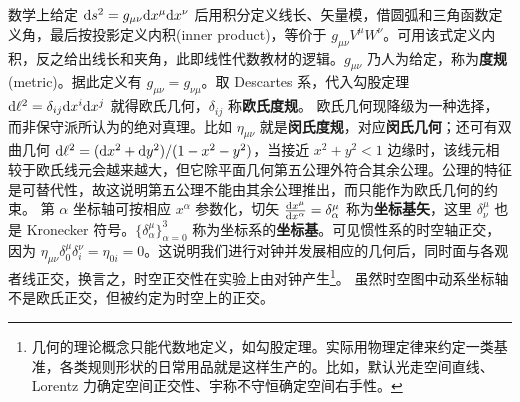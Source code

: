 数学上给定 $\dd s^2=g_{\mu\nu}\dd x^\mu\dd x^\nu$ 后用积分定义线长、矢量模，借圆弧和三角函数定义角，最后按投影定义内积(inner product)，等价于 $g_{\mu\nu}V^\mu W^\nu$。可用该式定义内积，反之给出线长和夹角，此即线性代数教材的逻辑。$g_{\mu\nu}$ 乃人为给定，称为\textbf{度规}(metric)。据此定义有 $g_{\mu\nu}=g_{\nu\mu}$。取 Descartes 系，代入勾股定理 $\dd\ell^2=\delta_{ij}\dd x^i\dd x^j$ 就得欧氏几何，$\delta_{ij}$ 称\textbf{欧氏度规}。
欧氏几何现降级为一种选择，而非保守派所认为的绝对真理。比如 ${\eta}_{\mu\nu}$ 就是\textbf{闵氏度规}，对应\textbf{闵氏几何}；还可有双曲几何 $\dd\ell^2=(\dd x^2+\dd y^2)/(1-x^2-y^2)$，当接近 $x^2+y^2<1$ 边缘时，该线元相较于欧氏线元会越来越大，但它除平面几何第五公理外符合其余公理。公理的特征是可替代性，故这说明第五公理不能由其余公理推出，而只能作为欧氏几何的约束。
第 $\alpha$ 坐标轴可按相应 $x^\alpha$ 参数化，切矢 $\dv{x^\mu}{x^\alpha}=\delta^\mu_\alpha$ 称为\textbf{坐标基矢}，这里 $\delta^\mu_\nu$ 也是 Kronecker 符号。$\{\delta_\alpha^\mu\}_{\alpha=0}^3$ 称为坐标系的\textbf{坐标基}。可见惯性系的时空轴正交，因为 $\eta_{\mu\nu}\delta^\mu_0\delta^\nu_i=\eta_{0i}=0$。这说明我们进行对钟并发展相应的几何后，同时面与各观者线正交，换言之，时空正交性在实验上由对钟产生\footnote{几何的理论概念只能代数地定义，如勾股定理。实际用物理定律来约定一类基准，各类规则形状的日常用品就是这样生产的。比如，默认光走空间直线、Lorentz 力确定空间正交性、宇称不守恒确定空间右手性。}。
虽然时空图中动系坐标轴不是欧氏正交，但被约定为时空上的正交。

